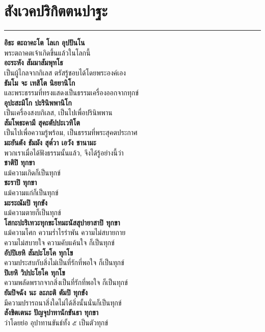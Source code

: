 \documentclass[12pt]{article}
\begin{document}
\section{สังเวคปริกิตตนปาฐะ}
\hrule
\textbf{อิธะ ตะถาคะโต โลเก อุปปันโน\\}
\indent พระตถาคตเจ้าเกิดขึ้นแล้วในโลกนี้\\
\textbf{อะระหัง สัมมาสัมพุทโธ\\}
\indent เป็นผู้ไกลจากกิเลส ตรัสรู้ชอบได้โดยพระองค์เอง\\
\textbf{ธัมโม จะ เทสิโต นิยยานิโก\\}
\indent และพระธรรมที่ทรงแสดงเป็นธรรมเครื่องออกจากทุกข์\\
\textbf{อุปะสะมิโก ปะรินิพพานิโก\\}
\indent เป็นเครื่องสงบกิเลส, เป็นไปเพื่อปรินิพพาน\\
\textbf{สัมโพธะคามี สุคะตัปปะเวทิโต\\}
\indent เป็นไปเพื่อความรู้พร้อม, เป็นธรรมที่พระสุคตประกาศ\\
\textbf{มะยันตัง ธัมมัง สุต๎วา เอวัง ชานามะ\\}
\indent พวกเราเมื่อได้ฟังธรรมนั้นแล้ว, จึงได้รู้อย่างนี้ว่า\\
\textbf{ชาติปิ ทุกขา\\}
\indent แม้ความเกิดก็เป็นทุกข์\\
\textbf{ชะราปิ ทุกขา\\}
\indent แม้ความแก่ก็เป็นทุกข์\\
\textbf{มะระณัมปิ ทุกขัง\\}
\indent แม้ความตายก็เป็นทุกข์\\
\textbf{โสกะปะริเทวะทุกขะโทมะนัสสุปายาสาปิ ทุกขา\\}
\indent แม้ความโศก ความร่ำไรรำพัน ความไม่สบายกาย\\
\indent ความไม่สบายใจ ความคับแค้นใจ ก็เป็นทุกข์\\
\textbf{อัปปิเยหิ สัมปะโยโค ทุกโข\\}
\indent ความประสบกับสิ่งไม่เป็นที่รักที่พอใจ ก็เป็นทุกข์\\
\textbf{ปิเยหิ วิปปะโยโค ทุกโข\\}
\indent ความพลัดพรากจากสิ่งเป็นที่รักที่พอใจ ก็เป็นทุกข์\\
\textbf{ยัมปิจฉัง นะ ละภะติ ตัมปิ ทุกขัง\\}
\indent มีความปรารถนาสิ่งใดไม่ได้สิ่งนั้นนั่นก็เป็นทุกข์\\
\textbf{สังขิตเตนะ ปัญจุปาทานักขันธา ทุกขา\\}
\indent ว่าโดยย่อ อุปาทานขันธ์ทั้ง ๕ เป็นตัวทุกข์\\
\end{document}
